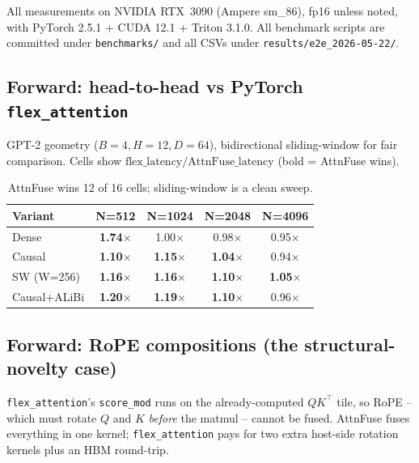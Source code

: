 \documentclass[11pt]{article}
\begin{document}
All measurements on NVIDIA RTX~3090 (Ampere sm\_86), fp16 unless
noted, with PyTorch 2.5.1 + CUDA 12.1 + Triton 3.1.0. All benchmark
scripts are committed under \texttt{benchmarks/} and all CSVs under
\texttt{results/e2e\_2026-05-22/}.

\subsection{Forward: head-to-head vs PyTorch \texttt{flex\_attention}}

GPT-2 geometry ($B=4, H=12, D=64$), bidirectional sliding-window for
fair comparison. Cells show $\text{flex\_latency} / \text{AttnFuse\_latency}$
(bold = AttnFuse wins).

\begin{table}[H]
\centering\small
\begin{tabular}{lcccc}
\toprule
\textbf{Variant} & \textbf{N=512} & \textbf{N=1024} & \textbf{N=2048} & \textbf{N=4096} \\
\midrule
Dense        & \textbf{1.74$\times$} & 1.00$\times$ & 0.98$\times$ & 0.95$\times$ \\
Causal       & \textbf{1.10$\times$} & \textbf{1.15$\times$} & \textbf{1.04$\times$} & 0.94$\times$ \\
SW (W=256)   & \textbf{1.16$\times$} & \textbf{1.16$\times$} & \textbf{1.10$\times$} & \textbf{1.05$\times$} \\
Causal+ALiBi & \textbf{1.20$\times$} & \textbf{1.19$\times$} & \textbf{1.10$\times$} & 0.96$\times$ \\
\bottomrule
\end{tabular}
\caption{AttnFuse wins 12 of 16 cells; sliding-window is a clean sweep.}
\end{table}

\subsection{Forward: RoPE compositions (the structural-novelty case)}

\texttt{flex\_attention}'s \texttt{score\_mod} runs on the already-computed
$QK^\top$ tile, so RoPE -- which must rotate $Q$ and $K$ \emph{before}
the matmul -- cannot be fused. AttnFuse fuses everything in one
kernel; \texttt{flex\_attention} pays for two extra host-side rotation
kernels plus an HBM round-trip.
\end{document}

